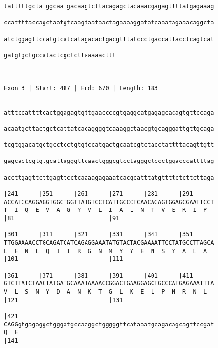 \documentclass{article}
\begin{document}
\begin{Verbatim}
tatttttgctatggcaatgacaagtcttacagagctacaaacgagagttttatgagaaag
                                                            
ccattttaccagctaatgtcaagtaataactagaaaaggatatcaaatagaaacaggcta
                                                            
atctggagttccatgtcatcatagacactgacgtttatccctgaccattacctcagtcat
                                                            
gatgtgctgccatactcgctcttaaaaacttt
                                
                                
 
Exon 3 | Start: 487 | End: 670 | Length: 183


atttccattttcactggagagtgttgaaccccgtgaggcatgagagcacagtgttccaga
                                                            
acaatgcttactgctcattatcacaggggtcaaaggctaacgtgcagggattgttgcaga
                                                            
tcgtggacatgctgcctcctgtgtccatgactgcaatcgtctacctattttacagttgtt
                                                            
gagcactcgtgtgcattagggttcaactgggcgtcctagggctccctggacccattttag
                                                            
accttgagttcttgagttcctcaaaagagaaatcacgcatttatgttttctcttcttaga
                                                            
|241      |251      |261      |271      |281      |291      
ACCATCCAGGAGGTGGCTGGTTATGTCCTCATTGCCCTCAACACAGTGGAGCGAATTCCT
T  I  Q  E  V  A  G  Y  V  L  I  A  L  N  T  V  E  R  I  P  
|81                           |91                           
  
|301      |311      |321      |331      |341      |351      
TTGGAAAACCTGCAGATCATCAGAGGAAATATGTACTACGAAAATTCCTATGCCTTAGCA
L  E  N  L  Q  I  I  R  G  N  M  Y  Y  E  N  S  Y  A  L  A  
|101                          |111                          
  
|361      |371      |381      |391      |401      |411      
GTCTTATCTAACTATGATGCAAATAAAACCGGACTGAAGGAGCTGCCCATGAGAAATTTA
V  L  S  N  Y  D  A  N  K  T  G  L  K  E  L  P  M  R  N  L  
|121                          |131                          
  
|421                                                        
CAGGgtgagaggctgggatgccaaggctgggggttcataaatgcagacagcagttccgat
Q  E                                                        
|141                                                        
  

\end{Verbatim}
\end{document}
